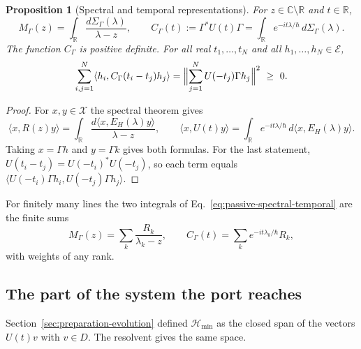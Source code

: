 \documentclass[11pt]{article}
\newtheorem{proposition}{Proposition}[section]
\theoremstyle{definition}
\newcommand{\C}{\mathbb C}
\newcommand{\R}{\mathbb R}
\newcommand{\Hmin}{\mathcal H_{\min}}
\begin{document}
\begin{proposition}[Spectral and temporal representations]
\label{prop:passive-spectral-temporal}
For $z\in\C\setminus\R$ and $t\in\R$,
\begin{equation}
 M_\Gamma(z)=\int_\R\frac{d\Sigma_\Gamma(\lambda)}{\lambda-z},\qquad
 C_\Gamma(t):=\Gamma^*U(t)\Gamma=\int_\R e^{-it\lambda/\hbar}\,d\Sigma_\Gamma(\lambda).
 \label{eq:passive-spectral-temporal}
\end{equation}
The function $C_\Gamma$ is positive definite. For all real $t_1,\dots,t_N$ and all $h_1,\dots,h_N\in\mathcal E$,
\begin{equation}
 \sum_{i,j=1}^N\langle h_i,C_\Gamma(t_i-t_j)h_j\rangle
   =\Bigl\|\sum_{j=1}^N U(-t_j)\Gamma h_j\Bigr\|^2\ \ge\ 0 .
 \label{eq:passive-time-positive}
\end{equation}
\end{proposition}
\begin{proof}
For $x,y\in\mathcal X$ the spectral theorem gives
\[
 \langle x,R(z)y\rangle=\int_\R\frac{d\langle x,E_H(\lambda)y\rangle}{\lambda-z},\qquad
 \langle x,U(t)y\rangle=\int_\R e^{-it\lambda/\hbar}\,d\langle x,E_H(\lambda)y\rangle .
\]
Taking $x=\Gamma h$ and $y=\Gamma k$ gives both formulas. For the last statement, $U(t_i-t_j)=U(-t_i)^*U(-t_j)$, so each term equals $\langle U(-t_i)\Gamma h_i,U(-t_j)\Gamma h_j\rangle$.
\end{proof}

For finitely many lines the two integrals of Eq.~\eqref{eq:passive-spectral-temporal} are the finite sums
\begin{equation}
 M_\Gamma(z)=\sum_k\frac{R_k}{\lambda_k-z},\qquad C_\Gamma(t)=\sum_ke^{-it\lambda_k/\hbar}R_k ,
 \label{eq:passive-finite-lines}
\end{equation}
with weights of any rank.

\subsection{The part of the system the port reaches}
\label{subsec:passive-minimal}

Section~\ref{sec:preparation-evolution} defined $\Hmin$ as the closed span of the vectors $U(t)v$ with $v\in D$. The resolvent gives the same space.
\end{document}
